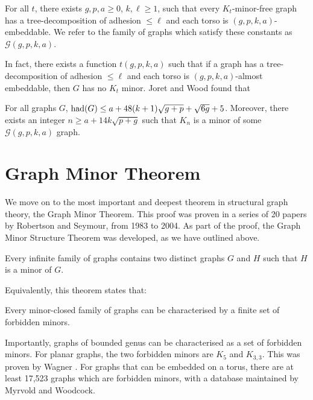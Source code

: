 \begin{theorem}
	For all $t$, there exists $g, p, a \geq 0$, $k, \ell \geq 1$, such that every $K_t$-minor-free graph has a tree-decomposition of adhesion $\leq \ell$ and each torso is $(g, p, k, a)$-embeddable. We refer to the family of graphs which satisfy these constants as $\mathcal{G}(g, p, k, a)$. 
\end{theorem}
In fact, there exists a function $t(g, p, k, a)$ such that if a graph has a tree-decomposition of adhesion $\leq \ell$ and each torso is $(g, p, k, a)$-almost embeddable, then $G$ has no $K_t$ minor. Joret and Wood\cite{joretCompleteGraphMinors2013} found that
\begin{theorem}\label{thm:graph_structure_bound_theorem}
	For all graphs $G$,
	$\text{had}(G) \leq a + 48(k + 1)\sqrt{g + p} + \sqrt{6g} + 5$. Moreover, there exists an integer $n \geq a + 1 4 k\sqrt{p + g}$ such that $K_n$ is a minor of some $\mathcal{G}(g, p, k, a)$ graph.
\end{theorem}

\section{Graph Minor Theorem}\label{sec:Graph Minor Theorem}
We move on to the most important and deepest theorem in structural graph theory, the Graph Minor Theorem. This proof was proven in a series of 20 papers by Robertson and Seymour, from 1983 to 2004. As part of the proof, the Graph Minor Structure Theorem was developed, as we have outlined above. 
\begin{theorem}
	Every infinite family of graphs contains two distinct graphs $G$ and $H$ such that $H$ is a minor of $G$.
\end{theorem}
Equivalently, this theorem states that:
\begin{theorem}
	Every minor-closed family of graphs can be characterised by a finite set of forbidden minors.
\end{theorem}
Importantly, graphs of bounded genus can be characterised as a set of forbidden minors.
For planar graphs, the two forbidden minors are $K_5$ and $K_{3,3}$. This was proven by Wagner \cite{wagnerUeberEigenschaftEbenen1937}. 
For graphs that can be embedded on a torus, there are at least 17,523 graphs which are forbidden minors, with a database maintained by Myrvold and Woodcock\cite{myrvoldLargeSetTorus2018}. 